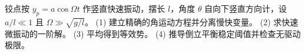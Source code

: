 铰点按 $y_p=a\cos\Omega t$ 作竖直快速振动，摆长 $l$，角度 $\theta$ 自向下竖直方向计，设 $a/l\ll1$ 且 $\Omega\gg\sqrt{g/l}$。
(1) 建立精确的角运动方程并分离慢快变量。
(2) 求快速微振动的一阶解。
(3) 平均得到等效势。
(4) 推导倒立平衡稳定阈值并检查无驱动极限。
